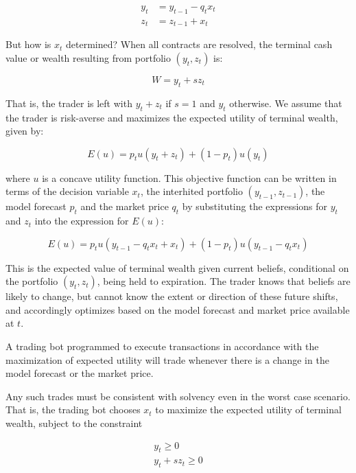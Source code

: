 \begin{equation}
    \begin{aligned}
        y_t & = y_{t-1} - q_t x_t \\
        z_t & = z_{t-1} + x_t
    \end{aligned}
\end{equation}

But how is $x_t$ determined? When all contracts are resolved, 
the terminal cash value or wealth resulting from portfolio $(y_t, z_t)$ is:

\begin{equation}
    W = y_t + s z_t 
\end{equation}

That is, the trader is left with $y_t + z_t$ if $s = 1$ and $y_t$ otherwise.
We assume that the trader is risk-averse and maximizes the expected utility 
of terminal wealth, given by: 

\begin{equation}
    E(u) = p_t u (y_t + z_t) + (1 - p_t) u (y_t)
\end{equation}

where $u$ is a concave utility function. 
This objective function can be written in terms of the decision variable 
$x_t$, the interhited portfolio $(y_{t-1}, z_{t-1})$, the model forecast
$p_t$ and the market price $q_t$ by substituting the expressions for
$y_t$ and $z_t$ into the expression for $E(u)$:

\begin{equation}
    E(u) = p_t u (y_{t-1} - q_t x_t + x_t) + (1 - p_t) u (y_{t-1} - q_t x_t)
\end{equation}

This is the expected value of terminal wealth given current beliefs, 
conditional on the portfolio $(y_t, z_t)$, being held to expiration.
The trader knows that beliefs are likely to change, but cannot know the extent
or direction of these future shifts, and accordingly optimizes 
based on the model forecast and market price available at $t$. 

A trading bot programmed to execute transactions in accordance with 
the maximization of expected utility will trade whenever there is a change 
in the model forecast or the market price. 

Any such trades must be consistent with solvency even in the worst case scenario.
That is, the trading bot chooses $x_t$ to 
maximize the expected utility of terminal wealth, subject to the constraint

\begin{equation}
    \begin{aligned}
        y_t \geq 0 \\
        y_t + s z_t \geq 0
    \end{aligned}
\end{equation}

